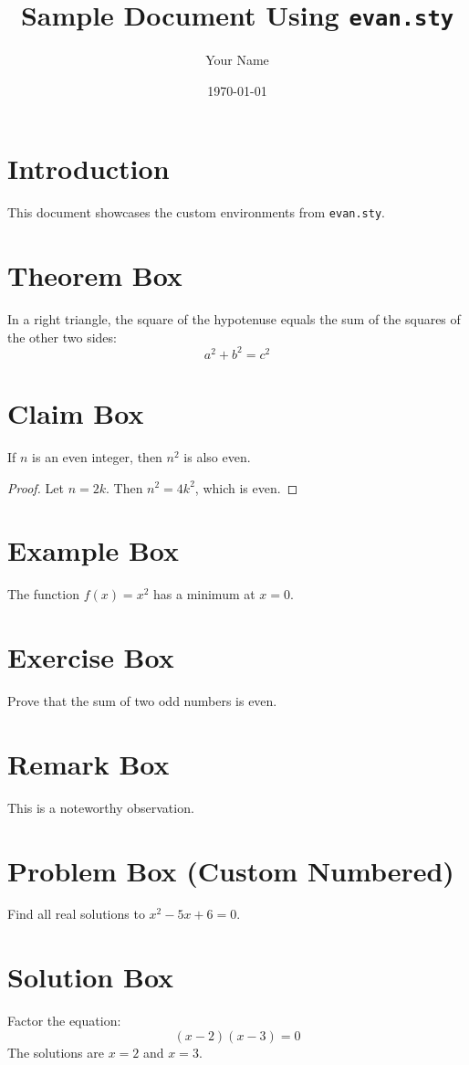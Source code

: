 \documentclass{article}
\title{Sample Document Using \texttt{evan.sty}}
\author{Your Name}
\date{\today}
\begin{document}
\maketitle

\section{Introduction}
This document showcases the custom environments from \texttt{evan.sty}.

\section{Theorem Box}
\begin{theorem}
    In a right triangle, the square of the hypotenuse equals the sum of the squares of the other two sides:
    \[ a^2 + b^2 = c^2 \]
\end{theorem}

\section{Claim Box}
\begin{claim}
    If \( n \) is an even integer, then \( n^2 \) is also even.
\end{claim}
\begin{proof}
    Let \( n = 2k \). Then \( n^2 = 4k^2 \), which is even.
\end{proof}

\section{Example Box}
\begin{example}
    The function \( f(x) = x^2 \) has a minimum at \( x = 0 \).
\end{example}

\section{Exercise Box}
\begin{exercise}
    Prove that the sum of two odd numbers is even.
\end{exercise}

\section{Remark Box}
\begin{remark}
    This is a noteworthy observation.
\end{remark}

\section{Problem Box (Custom Numbered)}
\begin{problem}[A1]
    Find all real solutions to \( x^2 - 5x + 6 = 0 \).
\end{problem}

\section{Solution Box}
\begin{solution}
    Factor the equation:
    \[ (x-2)(x-3) = 0 \]
    The solutions are \( x = 2 \) and \( x = 3 \).
\end{solution}
\end{document}
